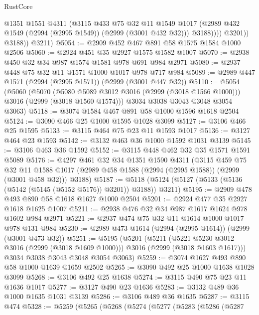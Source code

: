 \begin{lexlean}{RustCore}
\begin{coremodule}
                    @1351
                    @1551
                    @4311
                    (@3115
                      @433
                      @75
                      @32
                      @11
                      @1549
                      @1017
                      (@2989 @432 @1549 (@2994 (@2995 @1549)) (@2999 (@3001 @432 @32)))
                      @3188))))
              @3201))
          @3188))
      @3211)
@5054 := @2909 @452 @467 @891 @58 @1575 @1584 @1000 @2506
@5060 := @2924 @451 @35 @2927 @1575 @1582 @1007
@5070 := @2938 @450 @32 @34 @987 @1574 @1581 @978 @691 @984 @2971
@5080 := @2937 @448 @75 @32 @11 @1571 @1000 @1017 @978 @717 @984
@5089 := @2989 @447 @1571 (@2994 (@2995 @1571)) (@2999 (@3001 @447 @32))
@5110 := @5054
    (@5060
      (@5070
        (@5080 @5089 @3012 @3016 (@2999 (@3018 @1566 @1000)))
        @3016
        (@2999 (@3018 @1560 @1574)))
      @3034
      @3038
      @3043
      @3048
      @3054
      @3063)
@5118 := @3074 @1584 @467 @891 @58 @1000 @1596 @1618 @2504
@5124 := @3090 @466 @25 @1000 @1595 @1028 @3099
@5127 := @3106 @466 @25 @1595
@5133 := @3115 @464 @75 @23 @11 @1593 @1017
@5136 := @3127 @464 @23 @1593
@5142 := @3132 @463 @36 @1000 @1592 @1031 @3139
@5145 := @3106 @463 @36 @1592
@5152 := @3115 @448 @462 @32 @35 @1571 @1591 @5089
@5176 := @4297
    @461
    @32
    @34
    @1351
    @1590
    @4311
    (@3115
      @459
      @75
      @32
      @11
      @1588
      @1017
      (@2989 @458 @1588 (@2994 (@2995 @1588)) (@2999 (@3001 @458 @32)))
      @3188)
@5187 := @5118 (@5124 (@5127 (@5133 (@5136 (@5142 (@5145 (@5152 @5176)) @3201)) @3188)) @3211)
@5195 := @2909 @478 @493 @890 @58 @1618 @1627 @1000 @2504
@5201 := @2924 @477 @35 @2927 @1618 @1625 @1007
@5211 := @2938 @476 @32 @34 @987 @1617 @1624 @978 @1602 @984 @2971
@5221 := @2937 @474 @75 @32 @11 @1614 @1000 @1017 @978 @131 @984
@5230 := @2989 @473 @1614 (@2994 (@2995 @1614)) (@2999 (@3001 @473 @32))
@5251 := @5195
    (@5201
      (@5211
        (@5221 @5230 @3012 @3016 (@2999 (@3018 @1609 @1000)))
        @3016
        (@2999 (@3018 @1603 @1617)))
      @3034
      @3038
      @3043
      @3048
      @3054
      @3063)
@5259 := @3074 @1627 @493 @890 @58 @1000 @1639 @1659 @2502
@5265 := @3090 @492 @25 @1000 @1638 @1028 @3099
@5268 := @3106 @492 @25 @1638
@5274 := @3115 @490 @75 @23 @11 @1636 @1017
@5277 := @3127 @490 @23 @1636
@5283 := @3132 @489 @36 @1000 @1635 @1031 @3139
@5286 := @3106 @489 @36 @1635
@5287 := @3115 @474
@5328 := @5259
    (@5265
      (@5268
        (@5274
          (@5277
            (@5283
              (@5286
                (@5287

\end{coremodule}
\end{lexlean}
